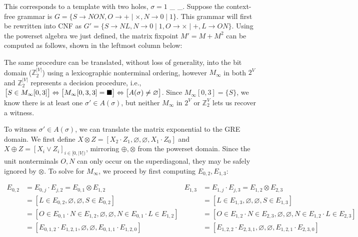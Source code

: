 \documentclass[sigplan,acmsmall,nonacm,screen]{acmart}\settopmatter{printfolios=false,printccs=false,printacmref=false}
\begin{document}
\noindent This corresponds to a template with two holes, $\sigma = 1$ \_ \_. Suppose the context-free grammar is $G=\{S\rightarrow N O N, O \rightarrow + \mid \times, N \rightarrow 0 \mid 1\}$. This grammar will first be rewritten into CNF as $G'= \{S \rightarrow N L, N \rightarrow 0 \mid 1, O \rightarrow \times \mid +, L \rightarrow O N\}$. Using the powerset algebra we just defined, the matrix fixpoint $M' = M + M^2$ can be computed as follows, shown in the leftmost column below:\vspace{0.3cm}



\vspace{8pt}The same procedure can be translated, without loss of generality, into the bit domain ($\mathbb{Z}_2^{|V|}$) using a lexicographic nonterminal ordering, however $M_\infty$ in both $2^V$ and $\mathbb{Z}_2^{|V|}$ represents a decision procedure, i.e., $\big[S\in M_\infty[0, 3]\big]\Leftrightarrow \big[M_\infty[0, 3, 3]=\blacksquare\big] \Leftrightarrow \big[A(\sigma) \neq \varnothing\big]$. Since $M_\infty[0, 3] = \{S\}$, we know there is at least one $\sigma' \in A(\sigma)$, but neither $M_\infty$ in $2^V$ or $\mathbb{Z}_2^V$ lets us recover a witness.


To witness $\sigma' \in A(\sigma)$, we can translate the matrix exponential to the GRE domain. We first define $X \otimes Z = [X_2 \cdot Z_1, \varnothing, \varnothing, X_1 \cdot Z_0]$ and $X \oplus Z = [X_i \lor Z_i]_{i \in [0, |V|)}$, mirroring $\oplus, \otimes$ from the powerset domain. Since the unit nonterminals $O, N$ can only occur on the superdiagonal, they may be safely ignored by $\otimes$. To solve for $M_\infty$, we proceed by first computing $E_{0, 2}, E_{1, 3}$:\vspace{-8pt}

\begin{small}
\begin{align*}
  E_{0, 2} &= E_{0, j} \cdot E_{j, 2} = E_{0, 1} \otimes E_{1, 2}                         &  E_{1, 3} &= E_{1, j} \cdot E_{j, 3} = E_{1, 2} \otimes E_{2, 3}\\
  &= [L \in E_{0, 2}, \varnothing, \varnothing, S \in E_{0, 2}]                                           &  &= [L \in E_{1, 3}, \varnothing, \varnothing, S \in E_{1, 3}]\\
  &= [O \in E_{0, 1} \cdot N \in E_{1, 2}, \varnothing, \varnothing, N \in E_{0, 1} \cdot L \in E_{1, 2}] &  &= [O \in E_{1, 2} \cdot N \in E_{2, 3}, \varnothing, \varnothing, N \in E_{1, 2} \cdot L \in E_{2, 3}]\\
  &= [E_{0, 1, 2} \cdot E_{1, 2, 1}, \varnothing, \varnothing, E_{0, 1, 1} \cdot E_{1, 2, 0}]             &  &= [E_{1, 2, 2} \cdot E_{2, 3, 1}, \varnothing, \varnothing, E_{1, 2, 1} \cdot E_{2, 3, 0}]
\end{align*}
\end{small}\vspace{-8pt}
\end{document}
